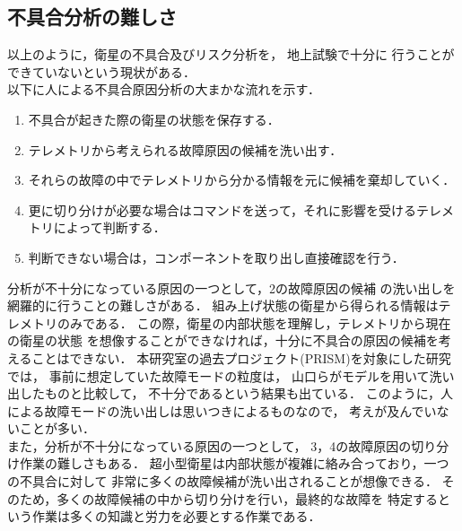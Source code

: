 \documentclass[11pt]{article}
\begin{document}
\subsection{不具合分析の難しさ}
以上のように，衛星の不具合及びリスク分析を，
地上試験で十分に
行うことができていないという現状がある．\\
以下に人による不具合原因分析の大まかな流れを示す．
\begin{enumerate}
   \item 不具合が起きた際の衛星の状態を保存する． %
   \item テレメトリから考えられる故障原因の候補を洗い出す．
   \item それらの故障の中でテレメトリから分かる情報を元に候補を棄却していく．
   \item 更に切り分けが必要な場合はコマンドを送って，それに影響を受けるテレメトリによって判断する．
   \item 判断できない場合は，コンポーネントを取り出し直接確認を行う．
\end{enumerate}
分析が不十分になっている原因の一つとして，2の故障原因の候補
の洗い出しを網羅的に行うことの難しさがある．
組み上げ状態の衛星から得られる情報はテレメトリのみである．
この際，衛星の内部状態を理解し，テレメトリから現在の衛星の状態
を想像することができなければ，十分に不具合の原因の候補を考えることはできない．
本研究室の過去プロジェクト(PRISM)を対象にした研究では，
事前に想定していた故障モードの粒度は，
山口ら\cite{Yamaguchi2014}がモデルを用いて洗い出したものと比較して，
不十分であるという結果も出ている．
このように，人による故障モードの洗い出しは思いつきによるものなので，
考えが及んでいないことが多い．\\
また，分析が不十分になっている原因の一つとして，
3，4の故障原因の切り分け作業の難しさもある．
超小型衛星は内部状態が複雑に絡み合っており，一つの不具合に対して
非常に多くの故障候補が洗い出されることが想像できる．
そのため，多くの故障候補の中から切り分けを行い，最終的な故障を
特定するという作業は多くの知識と労力を必要とする作業である．

\end{document}
